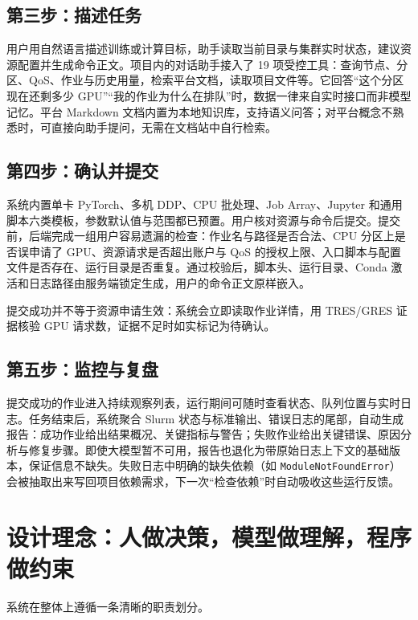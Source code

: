 \documentclass[UTF8,11pt,a4paper]{ctexart}
\newcommand{\code}[1]{\texttt{\small #1}}
\begin{document}

\subsection{第三步：描述任务}
用户用自然语言描述训练或计算目标，助手读取当前目录与集群实时状态，建议资源配置并生成命令正文。项目内的对话助手接入了 19 项受控工具：查询节点、分区、QoS、作业与历史用量，检索平台文档，读取项目文件等。它回答“这个分区现在还剩多少 GPU”“我的作业为什么在排队”时，数据一律来自实时接口而非模型记忆。平台 Markdown 文档内置为本地知识库，支持语义问答；对平台概念不熟悉时，可直接向助手提问，无需在文档站中自行检索。

\subsection{第四步：确认并提交}
系统内置单卡 PyTorch、多机 DDP、CPU 批处理、Job Array、Jupyter 和通用脚本六类模板，参数默认值与范围都已预置。用户核对资源与命令后提交。提交前，后端完成一组用户容易遗漏的检查：作业名与路径是否合法、CPU 分区上是否误申请了 GPU、资源请求是否超出账户与 QoS 的授权上限、入口脚本与配置文件是否存在、运行目录是否重复。通过校验后，脚本头、运行目录、Conda 激活和日志路径由服务端锁定生成，用户的命令正文原样嵌入。


提交成功并不等于资源申请生效：系统会立即读取作业详情，用 TRES/GRES 证据核验 GPU 请求数，证据不足时如实标记为待确认。

\subsection{第五步：监控与复盘}
提交成功的作业进入持续观察列表，运行期间可随时查看状态、队列位置与实时日志。任务结束后，系统聚合 Slurm 状态与标准输出、错误日志的尾部，自动生成报告：成功作业给出结果概况、关键指标与警告；失败作业给出关键错误、原因分析与修复步骤。即使大模型暂不可用，报告也退化为带原始日志上下文的基础版本，保证信息不缺失。失败日志中明确的缺失依赖（如 \code{ModuleNotFoundError}）会被抽取出来写回项目依赖需求，下一次“检查依赖”时自动吸收这些运行反馈。


\section{设计理念：人做决策，模型做理解，程序做约束}
系统在整体上遵循一条清晰的职责划分。
\end{document}
